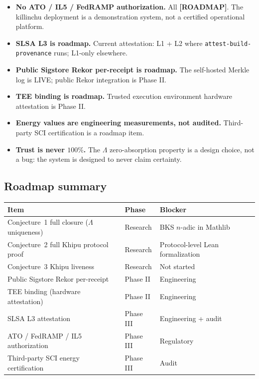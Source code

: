\documentclass[11pt,letterpaper]{article}
\theoremstyle{definition}
\newcommand{\Lam}{\Lambda}
\newcommand{\roadmap}{\textbf{[ROADMAP]}}
\begin{document}
\begin{itemize}
\item \textbf{No ATO / IL5 / FedRAMP authorization.}  All \roadmap{}.  The
  killinchu deployment is a demonstration system, not a certified operational
  platform.
\item \textbf{SLSA L3 is roadmap.}  Current attestation: L1 + L2 where
  \texttt{attest-build-provenance} runs; L1-only elsewhere.
\item \textbf{Public Sigstore Rekor per-receipt is roadmap.}  The self-hosted
  Merkle log is LIVE; public Rekor integration is Phase II.
\item \textbf{TEE binding is roadmap.}  Trusted execution environment hardware
  attestation is Phase II.
\item \textbf{Energy values are engineering measurements, not audited.}
  Third-party SCI certification is a roadmap item.
\item \textbf{Trust is never $100\%$.}  The $\Lam$ zero-absorption property
  is a design choice, not a bug: the system is designed to never claim
  certainty.
\end{itemize}

\subsection{Roadmap summary}

\begin{center}\small
\begin{tabular}{@{}p{5.5cm}p{2.8cm}p{4.0cm}@{}}
\toprule
\textbf{Item} & \textbf{Phase} & \textbf{Blocker} \\
\midrule
Conjecture~1 full closure ($\Lam$ uniqueness) & Research & BKS $n$-adic in Mathlib \\
Conjecture~2 full Khipu protocol proof & Research & Protocol-level Lean formalization \\
Conjecture~3 Khipu liveness & Research & Not started \\
Public Sigstore Rekor per-receipt & Phase II & Engineering \\
TEE binding (hardware attestation) & Phase II & Engineering \\
SLSA L3 attestation & Phase III & Engineering + audit \\
ATO / FedRAMP / IL5 authorization & Phase III & Regulatory \\
Third-party SCI energy certification & Phase III & Audit \\
\bottomrule
\end{tabular}
\end{center}
\end{document}
